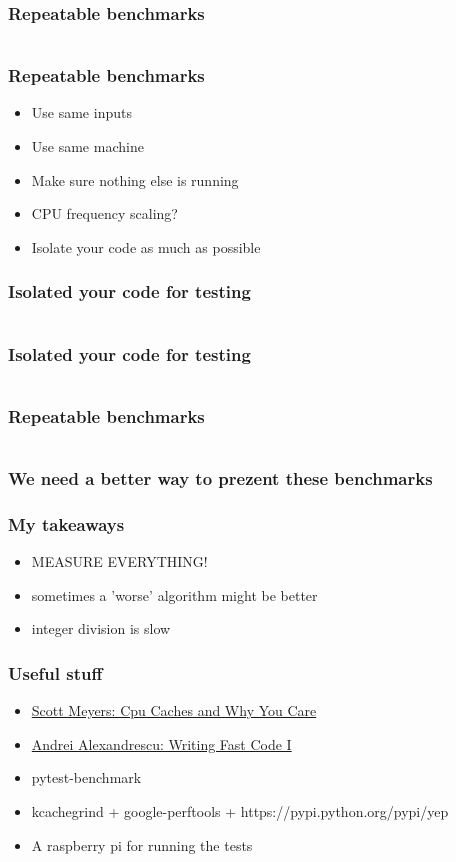 \documentclass{beamer}
\begin{document}
\begin{frame}
  \frametitle{Repeatable benchmarks}
   {\fontsize{5.2pt}{5.2pt}
     \inputminted{python}{snippets/bench2.txt}
   }
\end{frame}
  
\begin{frame}
  \frametitle{Repeatable benchmarks}
  \begin{itemize}
  \item Use same inputs
  \item Use same machine
  \item Make sure nothing else is running
  \item CPU frequency scaling?
  \item Isolate your code as much as possible
  \end{itemize}
\end{frame}

\begin{frame}
  \frametitle{Isolated your code for testing}
  \inputminted[fontsize=\footnotesize]{python}{snippets/bench1.py}
\end{frame}

\begin{frame}
  \frametitle{Isolated your code for testing}
  \inputminted[fontsize=\footnotesize]{c}{snippets/bench.c}
\end{frame}

\begin{frame}
  \frametitle{Repeatable benchmarks}
   {\fontsize{4.5pt}{4.5pt}
     \inputminted{python}{snippets/bench3.txt}
   }
\end{frame}

\begin{frame}
  \frametitle{We need a better way to prezent these benchmarks}
\end{frame}

\begin{frame}
  \frametitle{My takeaways}
  \begin{itemize}
  \item MEASURE EVERYTHING!
  \item sometimes a 'worse' algorithm might be better
  \item integer division is slow
  \end{itemize}
\end{frame}

\begin{frame}
  \frametitle{Useful stuff}
  \begin{itemize}
  \item  \href{https://www.youtube.com/watch?v=WDIkqP4JbkE}{Scott Meyers: Cpu Caches and Why You Care}
  \item  \href{https://www.youtube.com/watch?v=vrfYLlR8X8k}{Andrei Alexandrescu: Writing Fast Code I}
  \item pytest-benchmark
  \item kcachegrind + google-perftools + https://pypi.python.org/pypi/yep
  \item A raspberry pi for running the tests

  \end{itemize}
\end{frame}
\end{document}
